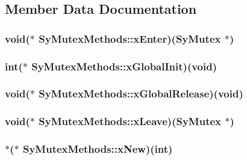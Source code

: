\subsection{Member Data Documentation}
\hypertarget{struct_sy_mutex_methods_aec9ac983ac838814d74708d45427cc95}{
\subsubsection[{x\-Enter}]{\setlength{\rightskip}{0pt plus 5cm}void($\ast$ Sy\-Mutex\-Methods\-::x\-Enter)({\bf Sy\-Mutex} $\ast$)}}\label{d9/d6f/struct_sy_mutex_methods_aec9ac983ac838814d74708d45427cc95}
\hypertarget{struct_sy_mutex_methods_a78325b9c74317afece08989a7e9da5d0}{
\subsubsection[{x\-Global\-Init}]{\setlength{\rightskip}{0pt plus 5cm}int($\ast$ Sy\-Mutex\-Methods\-::x\-Global\-Init)(void)}}\label{d9/d6f/struct_sy_mutex_methods_a78325b9c74317afece08989a7e9da5d0}
\hypertarget{struct_sy_mutex_methods_a18ecc0161613436961790cecb7400842}{
\subsubsection[{x\-Global\-Release}]{\setlength{\rightskip}{0pt plus 5cm}void($\ast$ Sy\-Mutex\-Methods\-::x\-Global\-Release)(void)}}\label{d9/d6f/struct_sy_mutex_methods_a18ecc0161613436961790cecb7400842}
\hypertarget{struct_sy_mutex_methods_a754cdbb6add51e8a2946a63e89901c75}{
\subsubsection[{x\-Leave}]{\setlength{\rightskip}{0pt plus 5cm}void($\ast$ Sy\-Mutex\-Methods\-::x\-Leave)({\bf Sy\-Mutex} $\ast$)}}\label{d9/d6f/struct_sy_mutex_methods_a754cdbb6add51e8a2946a63e89901c75}
\hypertarget{struct_sy_mutex_methods_a4afd79bd187aac3d1dd72c5a1593b808}{
\subsubsection[{x\-New}]{ $\ast$($\ast$ Sy\-Mutex\-Methods\-::x\-New)(int)}}\label{d9/d6f/struct_sy_mutex_methods_a4afd79bd187aac3d1dd72c5a1593b808}
